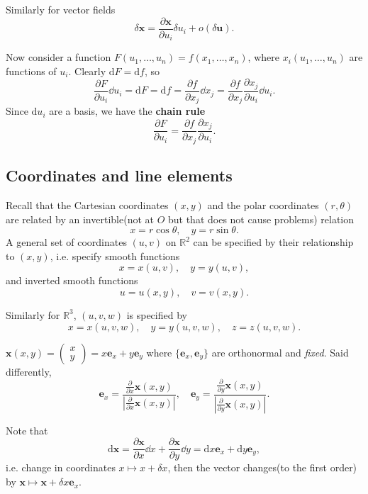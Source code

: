 Similarly for vector fields
\[
    \delta\mathbf{x} = \frac{\partial \mathbf{x}}{\partial u_i}\delta u_i+o(\delta\mathbf{u}). 
\]

Now consider a function $ F(u_1,\dots,u_n)=f(x_1,\dots,x_n) $, where $ x_i(u_1,\dots,u_n) $ are functions of $u_i$. Clearly $ \mathrm{d} F=\mathrm{d} f $, so 
\[
    \frac{\partial F}{\partial u_i} \dd u_i=\mathrm{d} F = \mathrm{d} f= \frac{\partial f}{\partial x_j}\dd x_j = \frac{\partial f}{\partial x_j}\frac{\partial x_j}{\partial u_i}\dd u_i.  
\]
Since $\mathrm{d} u_i$ are a basis, we have the \textbf{chain rule}
\[
    \frac{\partial F}{\partial u_i}=\frac{\partial f}{\partial x_j}\frac{\partial x_j}{\partial u_i}.
\]

\subsection{Coordinates and line elements}
Recall that the Cartesian coordinates $ (x,y) $ and the polar coordinates $ (r,\theta) $ are related by an invertible(not at $O$ but that does not cause problems) relation
\[
    x=r \cos \theta,\quad y= r\sin \theta.
\]
A general set of coordinates $ (u,v) $ on $\mathbb{R}^2$ can be specified by their relationship to $(x,y)$, i.e. specify smooth functions
\[
    x=x(u,v),\quad y=y(u,v),
\]
and inverted smooth functions 
\[
    u=u(x,y),\quad v=v(x,y).
\]

Similarly for $ \mathbb{R}^{3} $, $(u,v,w)$ is specified by 
\[
    x=x(u,v,w),\quad y=y(u,v,w),\quad z=z(u,v,w).
\]

\begin{example}
    $ \mathbf{x}(x,y)=\begin{pmatrix}
        x \\ y
    \end{pmatrix}=x\mathbf{e}_x+y\mathbf{e}_y $ where $ \{\mathbf{e}_x,\mathbf{e}_y\} $ are orthonormal and \textit{fixed}. Said differently,
    \[
        \mathbf{e}_x = \frac{\frac{\partial }{\partial x}\mathbf{x}(x,y) }{\left| \frac{\partial }{\partial x}\mathbf{x}(x,y) \right| },\quad \mathbf{e}_y=\frac{\frac{\partial }{\partial y}\mathbf{x}(x,y) }{\left| \frac{\partial }{\partial y}\mathbf{x}(x,y) \right| }.
    \]
\end{example}

Note that 
\[
    \mathrm{d} \mathbf{x}=\frac{\partial \mathbf{x}}{\partial x}\dd x+\frac{\partial \mathbf{x}}{\partial y}\dd y=\mathrm{d} x\mathbf{e}_x+\mathrm{d} y\mathbf{e}_y,  
\]
i.e. change in coordinates $ x \mapsto x+\delta x $, then the vector changes(to the first order) by $ \mathbf{x} \mapsto \mathbf{x}+\delta x\mathbf{e}_x .$

